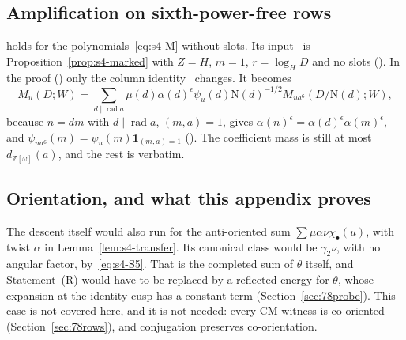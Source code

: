 \documentclass[11pt]{article}
\numberwithin{equation}{section}
\newcommand{\OO}{\mathbb Z[\omega]}
\newcommand{\N}{\mathrm N}
\newcommand{\ind}{\mathbf1}
\begin{document}
\subsection{Amplification on sixth-power-free rows}\label{sec:s4-amplification}
\cite[Lemma~17.6]{OAI78} holds for the polynomials~\eqref{eq:s4-M} without slots.
Its input~\cite[eq.~(17.87)]{OAI78} is Proposition~\ref{prop:s4-marked} with $Z=H$,
$m=1$, $r=\log_HD$ and no slots (\cite[Section~17.7]{OAI78}). In the proof (\cite[proof of Lemma~17.6]{OAI78}) only the column
identity~\cite[eq.~(17.90)]{OAI78} changes. It becomes
\begin{equation}\label{eq:s4-sixth}
 M_u(D;W)=\sum_{d\mid\operatorname{rad}a}\mu(d)\alpha(d)^{\epsilon}\psi_u(d)\N(d)^{-1/2}M_{ua^6}(D/\N(d);W),
\end{equation}
because $n=dm$ with $d\mid\operatorname{rad}a$, $(m,a)=1$, gives $\alpha(n)^\epsilon=\alpha(d)^\epsilon\alpha(m)^\epsilon$,
and $\psi_{ua^6}(m)=\psi_u(m)\ind_{(m,a)=1}$ (\cite[proof of Lemma~17.6]{OAI78}). The coefficient mass is still at most
$d_{\OO}(a)$, and the rest is verbatim.

\subsection{Orientation, and what this appendix proves}\label{sec:s4-summary}
The descent itself would also run for the anti-oriented sum $\sum\mu\alpha\nu\overline{\chi_\bullet(u)}$, with twist
$\alpha$ in Lemma~\ref{lem:s4-transfer}. Its canonical class would be $\gamma_2\nu$, with no angular factor,
by~\eqref{eq:s4-S5}. That is the completed sum of $\theta$ itself, and Statement~(R) would have to be replaced by a
reflected energy for $\theta$, whose expansion at the identity cusp has a constant term (Section~\ref{sec:78probe}).
This case is not covered here, and it is not needed: every CM witness is co-oriented (Section~\ref{sec:78rows}),
and conjugation preserves co-orientation.
\end{document}
